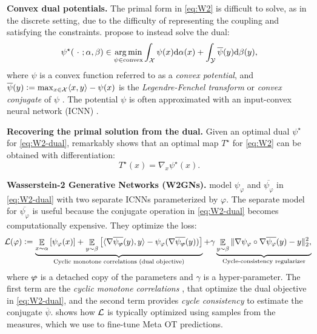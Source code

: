 \documentclass{article}
\newcommand{\defeq}{\vcentcolon=}
\begin{document}
\textbf{Convex dual potentials.}
The primal form in \cref{eq:W2} is difficult to solve, as in the
discrete setting, due to the difficulty of representing the coupling
and satisfying the constraints.
\citet{makkuva2020optimal,taghvaei2019wasserstein,korotin2019wasserstein,korotin2021continuous,korotin2022neural}
propose to instead solve the dual:
\begin{equation}
  \psi^\star(\ \cdot\ ; \alpha, \beta)\in \operatorname*{arg\,min}_{\psi\in{\rm convex}}\int_{\mathcal{X}} \psi(x){\rm d}\alpha(x) + \int_{\mathcal{Y}} \overline\psi(y){\rm d}\beta(y),
  \label{eq:W2-dual}
\end{equation}
where $\psi$ is a convex function referred to as a \emph{convex potential},
and $\overline\psi(y)\defeq \max_{x\in\gX} \langle x, y\rangle - \psi(x)$
is the \emph{Legendre-Fenchel transform} or \emph{convex conjugate}
of $\psi$ \citep{fenchel1949conjugate,rockafellar2015convex}.
The potential $\psi$ is often approximated with an
input-convex neural network (ICNN) \citep{amos2017input}.

\textbf{Recovering the primal solution from the dual.}
Given an optimal dual $\psi^\star$ for \cref{eq:W2-dual},
\citet{brenier1991polar} remarkably shows that an optimal map
$T^\star$ for \cref{eq:W2} can be obtained with differentiation:
\begin{equation}
  T^\star(x) = \nabla_x \psi^\star(x).
  \label{eq:W2-dual-to-primal}
\end{equation}

\textbf{Wasserstein-2 Generative Networks (W2GNs).}
\citet{korotin2019wasserstein} model $\psi_\varphi$ and
$\overline{\psi_\varphi}$ in \cref{eq:W2-dual} with two separate
ICNNs parameterized by $\varphi$.
The separate model for $\overline{\psi_\varphi}$ is useful because
the conjugate operation in \cref{eq:W2-dual} becomes
computationally expensive.
They optimize the loss:
\newcommand{\detachedphi}{\text{\sout{\ensuremath{\varphi}}}}
\begin{equation}
  \hspace{-1mm}
  \gL(\varphi) \defeq
    \underbrace{\E_{x\sim \alpha} \left[ \psi_\varphi(x)\right] +
      \E_{y\sim \beta} \left[ \langle \nabla\overline{\psi_\detachedphi}(y), y\rangle -
      \psi_\varphi(\nabla\overline{\psi_\detachedphi}(y)) \right]}_{\text{Cyclic monotone correlations (dual objective)}}
  + \gamma \underbrace{
    \E_{y\sim \beta} \|\nabla\psi_\varphi\circ \nabla\overline{\psi_\varphi}(y)-y\|_2^2,
  }_{\text{Cycle-consistency regularizer}}
  \label{eq:w2gn-loss}
\end{equation}
where $\detachedphi$ is a detached copy of the parameters
and $\gamma$ is a hyper-parameter.
The first term are the
\emph{cyclic monotone correlations}
\citep{chartrand2009gradient,taghvaei2019wasserstein},
that optimize the dual objective in \cref{eq:W2-dual},
and the second term provides \emph{cycle consistency}
\citep{zhu2017unpaired} to estimate the conjugate $\overline \psi$.
 shows how ${\mathcal{L}}$ is typically optimized
using samples from the measures, which we use to
fine-tune Meta OT predictions.
\end{document}
